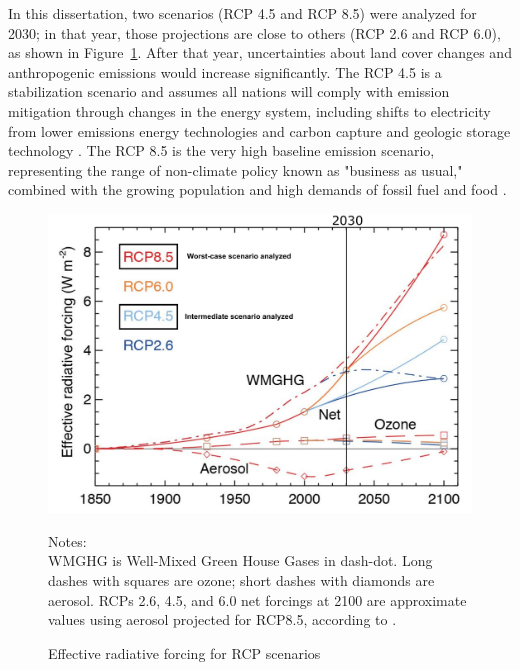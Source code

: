 In this dissertation, two scenarios (RCP 4.5 and RCP 8.5) were analyzed for 2030; in that year, those projections are close to others (RCP 2.6 and RCP 6.0), as shown in Figure~\ref{fig:RCPs}. 
After that year, uncertainties about land cover changes and anthropogenic emissions would increase significantly. 
The RCP 4.5 is a stabilization scenario and assumes all nations will comply with emission mitigation through changes in the energy system, including shifts to electricity from lower emissions energy technologies and carbon capture and geologic storage technology \citep{Thomson2011}.
The RCP 8.5 is the very high baseline emission scenario, representing the range of non-climate policy known as "business as usual," combined with the growing population and high demands of fossil fuel and food \citep{Riahi2011}.

\begin{figure}[htbp]
  \begin{center}
    \includegraphics[width=13cm]{fig/Fig8-22-1.pdf}
  \end{center}
  \caption{Effective radiative forcing for RCP scenarios \citep{IPCC2013}}{\scriptsize Notes:\\ WMGHG is Well-Mixed Green House Gases in dash-dot. Long dashes with squares are ozone; short dashes with diamonds are aerosol. RCPs 2.6, 4.5, and 6.0 net forcings at 2100 are approximate values using aerosol projected for RCP8.5, according to \cite{IPCC2013}.}
\label{fig:RCPs}
\end{figure}


